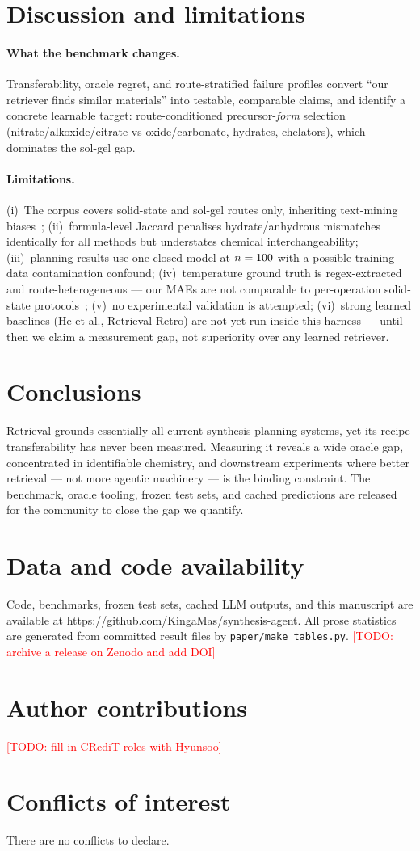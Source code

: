 \documentclass[10pt]{article}
\newcommand{\todo}[1]{\textcolor{red}{[TODO: #1]}}
\begin{document}
\section{Discussion and limitations}

\paragraph{What the benchmark changes.} Transferability, oracle regret,
and route-stratified failure profiles convert ``our retriever finds
similar materials'' into testable, comparable claims, and identify a
concrete learnable target: route-conditioned precursor-\emph{form}
selection (nitrate/alkoxide/citrate vs oxide/carbonate, hydrates,
chelators), which dominates the sol-gel gap.

\paragraph{Limitations.} (i)~The corpus covers solid-state and sol-gel
routes only, inheriting text-mining biases~\cite{kononova2019text};
(ii)~formula-level Jaccard penalises hydrate/anhydrous mismatches
identically for all methods but understates chemical interchangeability;
(iii)~planning results use one closed model at $n=100$ with a
possible training-data contamination confound; (iv)~temperature ground
truth is regex-extracted and route-heterogeneous --- our MAEs are not
comparable to per-operation solid-state protocols~\cite{prein2025ranking};
(v)~no experimental validation is attempted; (vi)~strong learned baselines
(He et al., Retrieval-Retro) are not yet run inside this harness ---
until then we claim a measurement gap, not superiority over any learned
retriever.

\section{Conclusions}

Retrieval grounds essentially all current synthesis-planning systems, yet
its recipe transferability has never been measured. Measuring it reveals
a wide oracle gap, concentrated in identifiable chemistry, and downstream
experiments where better retrieval --- not more agentic machinery --- is
the binding constraint. The benchmark, oracle tooling, frozen test sets,
and cached predictions are released for the community to close the gap we
quantify.

\section*{Data and code availability}
Code, benchmarks, frozen test sets, cached LLM outputs, and this
manuscript are available at
\url{https://github.com/KingaMas/synthesis-agent}. All prose statistics
are generated from committed result files by \texttt{paper/make\_tables.py}.
\todo{archive a release on Zenodo and add DOI}

\section*{Author contributions}
\todo{fill in CRediT roles with Hyunsoo}

\section*{Conflicts of interest}
There are no conflicts to declare.



\end{document}
